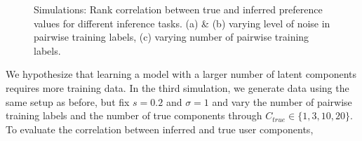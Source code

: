\begin{figure}[t]
\caption{Simulations: Rank correlation between true and inferred preference values for different inference tasks.  (a) \& (b) varying level of noise in pairwise training labels, (c) varying number of pairwise training labels. 
}
\end{figure}
We hypothesize that learning a model with a larger number of latent components
requires more training data.
In the third simulation, we generate data using the same setup as before, but fix $s=0.2$ and $\sigma=1$
and vary the number of pairwise training labels 
and the number of true components through
$C_{true} \in \{ 1, 3, 10, 20\}$.
To evaluate the correlation between inferred and true user components, 
